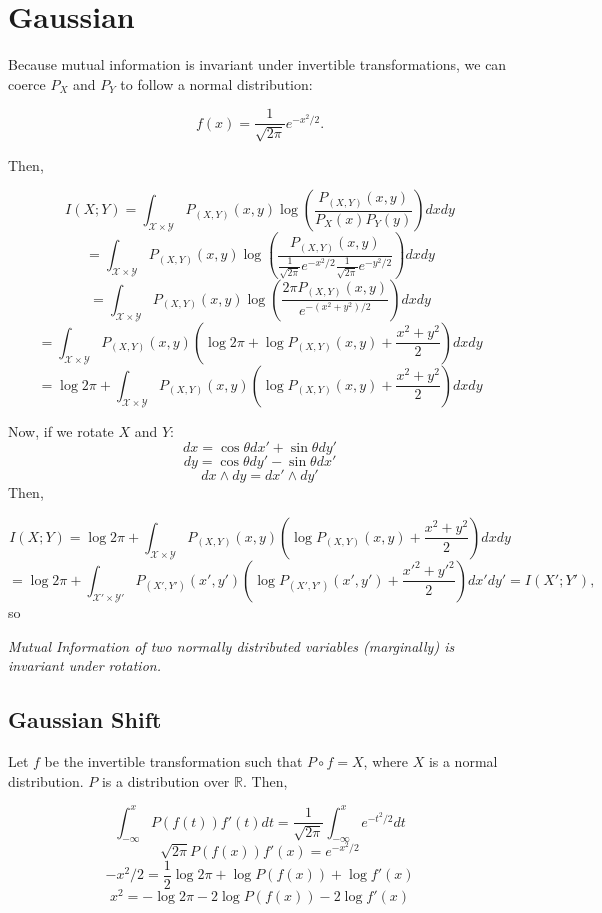 \documentclass[12pt]{article}
\newcommand{\R}{\mathbb{R}}
\begin{document}
\section*{Gaussian}

Because mutual information is invariant under invertible transformations, we can coerce $P_X$ and $P_Y$ to follow a normal distribution:

$$f(x) = \frac{1}{\sqrt{2\pi}}e^{-x^2/2}.$$

Then,

$$I(X;Y) = \int_{\mathcal{X}\times\mathcal{Y}}P_{(X,Y)}(x,y)\log\left(\frac{P_{(X,Y)}(x,y)}{P_X(x)P_Y(y)}\right)dxdy$$
$$= \int_{\mathcal{X}\times\mathcal{Y}}P_{(X,Y)}(x,y)\log\left(\frac{P_{(X,Y)}(x,y)}{\frac{1}{\sqrt{2\pi}}e^{-x^2/2}\frac{1}{\sqrt{2\pi}}e^{-y^2/2}}\right)dxdy$$
$$= \int_{\mathcal{X}\times\mathcal{Y}}P_{(X,Y)}(x,y)\log\left(\frac{2\pi P_{(X,Y)}(x,y)}{e^{-(x^2+y^2)/2}}\right)dxdy$$
$$= \int_{\mathcal{X}\times\mathcal{Y}}P_{(X,Y)}(x,y)\left(\log 2\pi + \log P_{(X,Y)}(x,y) + \frac{x^2 + y^2}{2}\right)dxdy$$
$$= \log 2\pi + \int_{\mathcal{X}\times\mathcal{Y}}P_{(X,Y)}(x,y)\left(\log P_{(X,Y)}(x,y) + \frac{x^2 + y^2}{2}\right)dxdy$$

Now, if we rotate $X$ and $Y$:
$$dx = \cos \theta dx' + \sin \theta dy'$$
$$dy = \cos \theta dy' - \sin \theta dx'$$
$$dx \wedge dy = dx' \wedge dy'$$
Then,

$$I(X;Y) = \log 2\pi + \int_{\mathcal{X}\times\mathcal{Y}}P_{(X,Y)}(x,y)\left(\log P_{(X,Y)}(x,y) + \frac{x^2+y^2}{2}\right)dxdy$$
$$= \log 2\pi + \int_{\mathcal{X}'\times\mathcal{Y}'}P_{(X',Y')}(x',y')\left(\log P_{(X',Y')}(x',y') + \frac{x'^2+y'^2}{2}\right)dx'dy' = I(X';Y'),$$
so
\begin{center}
{\it Mutual Information of two normally distributed variables (marginally) is invariant under rotation.}
\end{center}

\newpage

\subsection*{Gaussian Shift}

Let $f$ be the invertible transformation such that $P \circ f = X$, where $X$ is a normal distribution. $P$ is a distribution over $\R$.
Then,

$$\int_{-\infty}^x P(f(t))f'(t)dt = \frac{1}{\sqrt{2\pi}}\int_{-\infty}^x e^{-t^2/2}dt$$
$$\sqrt{2\pi} P(f(x))f'(x) = e^{-x^2/2}$$
$$-x^2/2 = \frac{1}{2}\log 2\pi + \log P(f(x)) + \log f'(x)$$
$$x^2 = -\log 2\pi - 2\log P(f(x)) - 2 \log f'(x)$$
\end{document}
